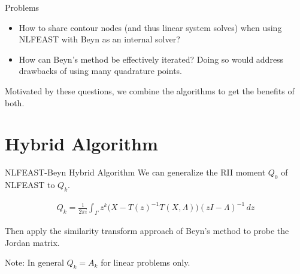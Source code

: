 \documentclass[mathserif, xcolor=table]{beamer}
\begin{document}
\begin{frame}{Problems}


	\begin{itemize}
	
		\item How to share contour nodes (and thus linear system solves) when using NLFEAST with Beyn as an internal solver?
		\vspace{2em}

		\item How can Beyn's method be effectively iterated? Doing so would address drawbacks of using many quadrature points.
	\end{itemize}

	\vspace{2em}

	Motivated by these questions, we combine the algorithms to get the benefits of both.


\end{frame}

\section{Hybrid Algorithm}

\begin{frame}{NLFEAST-Beyn Hybrid Algorithm}
	We can generalize the RII moment \( Q_0 \) of NLFEAST to \( Q_k \).	

	\begin{align}
		Q_k = \frac{1}{2 \pi i } \int_\Gamma z^k \Big(X - {T(z)}^{-1} T(X, \Lambda) \Big) {(zI - \Lambda)}^{-1} \, dz
	\end{align}

	\vspace{1em}

	Then apply the similarity transform approach of Beyn's method to probe the Jordan matrix.

	\vspace{2em}
	Note: In general \( Q_k = A_k \) for linear problems only. 

\end{frame}

\end{document}
